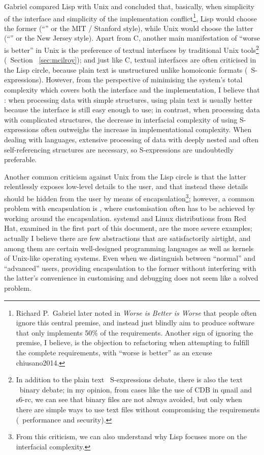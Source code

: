Gabriel compared Lisp with Unix and concluded that, basically, when simplicity
of the interface and simplicity of the implementation conflict\footnote{Richard
P.\ Gabriel later noted in \emph{Worse is Better is Worse} that people often
ignore this central premise, and instead just blindly aim to produce software
that only implements 50\% of the requirements.  Another sign of ignoring the
premise, I believe, is the objection to refactoring when attempting to fulfill
the complete requirements, with ``worse is better'' as an excuse\cupercite%
{chiusano2014}.}, Lisp would choose the former (``'' or
the MIT / Stanford style), while Unix would choose the latter (``'' or the New Jersey style).  Apart from C, another main manifestation
of ``worse is better'' in Unix is the preference of textual interfaces by
traditional Unix tools\footnote{In addition to the plain text \vs~S-expressions
debate, there is also the text \vs~binary debate; in my opinion, from cases
like the use of CDB in qmail and s6-rc, we can see that binary files are not
always avoided, but only when there are simple ways to use text files without
compromising the requirements (\eg~performance and security).} (\cf~Section~%
\ref{sec:mcilroy}); and just like C, textual interfaces are often criticised in
the Lisp circle, because plain text is unstructured unlike homoiconic formats
(\eg~S-expressions).  However, from the perspective of minimising the system's
total complexity which covers both the interface and the implementation, I
believe that : when processing data with simple structures, using
plain text is usually better because the interface is still easy enough to use;
in contrast, when processing data with complicated structures, the decrease in
interfacial complexity of using S-expressions often outweighs the increase
in implementational complexity.  When dealing with languages, extensive
processing of data with deeply nested and often self-referencing
structures are necessary, so S-expressions are undoubtedly preferable.

Another common criticism against Unix from the Lisp circle is that the latter
relentlessly exposes low-level details to the user, and that instead these
details should be hidden from the user by means of encapsulation\footnote{From
this criticism, we can also understand why Lisp focuses more on the interfacial
complexity.}; however, a common problem with encapsulation is , where customisation often has to be achieved by working around
the encapsulation.  systemd and Linux distributions from Red Hat, examined
in the first part of this document, are the more severe examples; actually
I believe there are few abstractions that are satisfactorily airtight,
and among them are certain well-designed programming languages as well
as kernels of Unix-like operating systems.  Even when we distinguish
between ``normal'' and ``advanced'' users, providing encapsulation
to the former without interfering with the latter's convenience
in customising and debugging does not seem like a solved problem.

